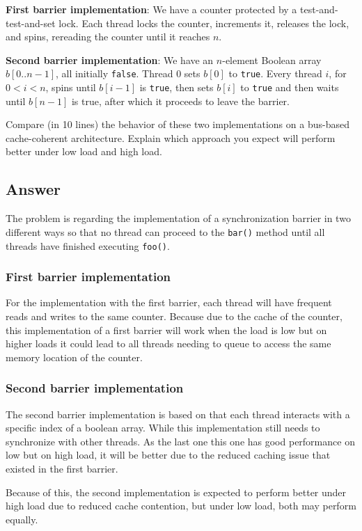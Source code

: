 \documentclass{article}
\begin{document}
\textbf{First barrier implementation}: We have a counter protected by a test-and-test-and-set lock. Each thread locks the counter, increments it, releases the lock, and spins, rereading the counter until it reaches $n$.

\textbf{Second barrier implementation}: We have an $n$-element Boolean array $b[0..n-1]$, all initially \texttt{false}. Thread 0 sets $b[0]$ to \texttt{true}. Every thread $i$, for $0 < i < n$, spins until $b[i-1]$ is \texttt{true}, then sets $b[i]$ to \texttt{true} and then waits until $b[n-1]$ is true, after which it proceeds to leave the barrier.

Compare (in 10 lines) the behavior of these two implementations on a bus-based cache-coherent architecture. Explain which approach you expect will perform better under low load and high load.

\subsection*{Answer}
The problem is regarding the implementation of a synchronization barrier in two different ways so that no thread can proceed to the \texttt{bar()} method until all threads have finished executing \texttt{foo()}.




\subsubsection*{First barrier implementation}
For the implementation with the first barrier, each thread will have frequent reads and writes to the same counter. Because due to the cache of the counter, this implementation of a first barrier will work when the load is low but on higher loads it could lead to all threads needing to queue to access the same memory location of the counter.


\subsubsection*{Second barrier implementation}
The second barrier implementation is based on that each thread interacts with a specific index of a boolean array. While this implementation still needs to synchronize with other threads. As the last one this one has good performance on low but on high load, it will be better due to the reduced caching issue that existed in the first barrier.


Because of this, the second implementation is expected to perform better under high load due to reduced cache contention, but under low load, both may perform equally.



\newpage
\printbibliography
\end{document}
